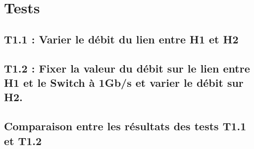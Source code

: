 \section{Tests}
\subsection{T1.1 : Varier le débit du lien entre H1 et H2 }
 
\newpage
\subsection{T1.2 : Fixer la valeur du débit sur le lien entre H1 et le Switch à 1Gb/s et varier le débit sur H2.}

\newpage
\subsection{Comparaison entre les résultats des tests T1.1 et T1.2}

